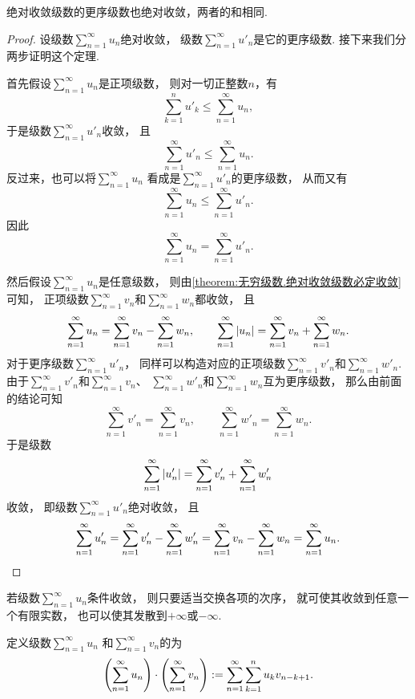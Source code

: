 \begin{theorem}[绝对收敛级数的可交换性]\label{theorem:无穷级数.绝对收敛级数的可交换性}
绝对收敛级数的更序级数也绝对收敛，两者的和相同.
\begin{proof}
设级数\(\sum_{n=1}^\infty u_n\)绝对收敛，
级数\(\sum_{n=1}^\infty u'_n\)是它的更序级数.
接下来我们分两步证明这个定理.

首先假设\(\sum_{n=1}^\infty u_n\)是正项级数，
则对一切正整数\(n\)，有\[
	\sum_{k=1}^n u'_k
	\leq \sum_{n=1}^\infty u_n,
\]
于是级数\(\sum_{n=1}^\infty u'_n\)收敛，
且\[
	\sum_{n=1}^\infty u'_n
	\leq \sum_{n=1}^\infty u_n.
\]
反过来，也可以将\(\sum_{n=1}^\infty u_n\)
看成是\(\sum_{n=1}^\infty u'_n\)的更序级数，
从而又有\[
	\sum_{n=1}^\infty u_n
	\leq \sum_{n=1}^\infty u'_n.
\]
因此\[
	\sum_{n=1}^\infty u_n
	= \sum_{n=1}^\infty u'_n.
\]

然后假设\(\sum_{n=1}^\infty u_n\)是任意级数，
则由\cref{theorem:无穷级数.绝对收敛级数必定收敛} 可知，
正项级数\(\sum_{n=1}^\infty v_n\)和\(\sum_{n=1}^\infty w_n\)都收敛，
且\[
	\sum_{n=1}^\infty u_n
	= \sum_{n=1}^\infty v_n
	- \sum_{n=1}^\infty w_n,
	\qquad
	\sum_{n=1}^\infty \abs{u_n}
	= \sum_{n=1}^\infty v_n
	+ \sum_{n=1}^\infty w_n.
\]
对于更序级数\(\sum_{n=1}^\infty u'_n\)，
同样可以构造对应的正项级数\(\sum_{n=1}^\infty v'_n\)和\(\sum_{n=1}^\infty w'_n\).
由于\(\sum_{n=1}^\infty v'_n\)和\(\sum_{n=1}^\infty v_n\)、
\(\sum_{n=1}^\infty w'_n\)和\(\sum_{n=1}^\infty w_n\)互为更序级数，
那么由前面的结论可知\[
	\sum_{n=1}^\infty v'_n
	= \sum_{n=1}^\infty v_n,
	\qquad
	\sum_{n=1}^\infty w'_n
	= \sum_{n=1}^\infty w_n.
\]
于是级数\[
	\sum_{n=1}^\infty \abs{u'_n}
	= \sum_{n=1}^\infty v'_n
	+ \sum_{n=1}^\infty w'_n
\]收敛，
即级数\(\sum_{n=1}^\infty u'_n\)绝对收敛，
且\[
	\sum_{n=1}^\infty u'_n
	= \sum_{n=1}^\infty v'_n
	- \sum_{n=1}^\infty w'_n
	= \sum_{n=1}^\infty v_n
	- \sum_{n=1}^\infty w_n
	= \sum_{n=1}^\infty u_n.
	\qedhere
\]
\end{proof}
\end{theorem}

\begin{theorem}[条件收敛级数的黎曼定理]
若级数\(\sum_{n=1}^\infty u_n\)条件收敛，
则只要适当交换各项的次序，
就可使其收敛到任意一个有限实数，
也可以使其发散到\(+\infty\)或\(-\infty\).
\end{theorem}

\begin{definition}\label{definition:无穷级数.绝对收敛级数的柯西乘积}
定义级数\(\sum_{n=1}^\infty u_n\)
和\(\sum_{n=1}^\infty v_n\)的为\[
	\left( \sum_{n=1}^\infty u_n \right)
	\cdot
	\left( \sum_{n=1}^\infty v_n \right)
	:=
	\sum_{n=1}^\infty \sum_{k=1}^n u_k v_{n-k+1}.
\]
\end{definition}


